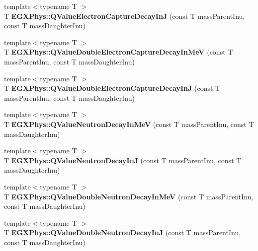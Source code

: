 \begin{DoxyCompactItemize}
\item 
\mbox{\label{_q_value_8hpp_a8407cb11bba4f32653f86d22959c1da4}} 
{\footnotesize template$<$typename T $>$ }\\T {\bfseries E\+G\+X\+Phys\+::\+Q\+Value\+Electron\+Capture\+Decay\+InJ} (const T mass\+Parent\+Inu, const T mass\+Daughter\+Inu)
\item 
\mbox{\label{_q_value_8hpp_ad668122e33b982364301c32c2ddf76b2}} 
{\footnotesize template$<$typename T $>$ }\\T {\bfseries E\+G\+X\+Phys\+::\+Q\+Value\+Double\+Electron\+Capture\+Decay\+In\+MeV} (const T mass\+Parent\+Inu, const T mass\+Daughter\+Inu)
\item 
\mbox{\label{_q_value_8hpp_a74d3d40a00b033f1d6615a3e77f7face}} 
{\footnotesize template$<$typename T $>$ }\\T {\bfseries E\+G\+X\+Phys\+::\+Q\+Value\+Double\+Electron\+Capture\+Decay\+InJ} (const T mass\+Parent\+Inu, const T mass\+Daughter\+Inu)
\item 
\mbox{\label{_q_value_8hpp_a620a6b6be2d0eb619e74244499daebf1}} 
{\footnotesize template$<$typename T $>$ }\\T {\bfseries E\+G\+X\+Phys\+::\+Q\+Value\+Neutron\+Decay\+In\+MeV} (const T mass\+Parent\+Inu, const T mass\+Daughter\+Inu)
\item 
\mbox{\label{_q_value_8hpp_a937f18fb2702de93bba879e574df61ec}} 
{\footnotesize template$<$typename T $>$ }\\T {\bfseries E\+G\+X\+Phys\+::\+Q\+Value\+Neutron\+Decay\+InJ} (const T mass\+Parent\+Inu, const T mass\+Daughter\+Inu)
\item 
\mbox{\label{_q_value_8hpp_abf2475452fd7ae9406a24e7600c67dda}} 
{\footnotesize template$<$typename T $>$ }\\T {\bfseries E\+G\+X\+Phys\+::\+Q\+Value\+Double\+Neutron\+Decay\+In\+MeV} (const T mass\+Parent\+Inu, const T mass\+Daughter\+Inu)
\item 
\mbox{\label{_q_value_8hpp_ac78fc62a11e704966d972517f8e4f38e}} 
{\footnotesize template$<$typename T $>$ }\\T {\bfseries E\+G\+X\+Phys\+::\+Q\+Value\+Double\+Neutron\+Decay\+InJ} (const T mass\+Parent\+Inu, const T mass\+Daughter\+Inu)

\end{DoxyCompactItemize}
